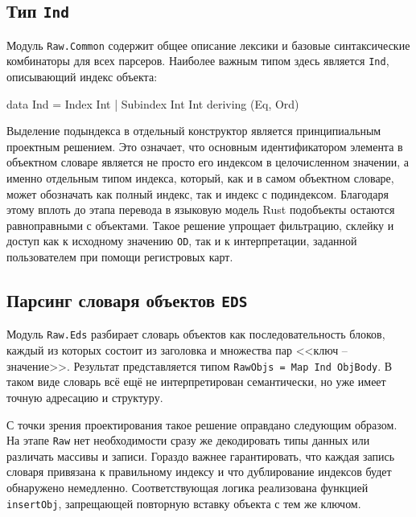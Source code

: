 \documentclass[a4paper,12pt]{article}
\begin{document}
\subsection{Тип \texttt{Ind}}

Модуль \texttt{Raw.Common} содержит общее описание лексики и базовые синтаксические
комбинаторы для всех парсеров. Наиболее важным типом здесь является \texttt{Ind},
описывающий индекс объекта:

\begin{flushleft}
\label{lst:ind}
\begin{MyCodes}
data Ind
  = Index Int
  | Subindex Int Int
  deriving (Eq, Ord)
\end{MyCodes}
\end{flushleft}

Выделение подындекса в отдельный конструктор является принципиальным проектным
решением. Это означает, что основным идентификатором элемента в объектном словаре
является не просто его индексом в целочисленном значении, а именно отдельным типом индекса,
который, как и в самом объектном словаре, может обозначать как полный индекс, так и
индекс с подиндексом. Благодаря этому вплоть до этапа перевода в языковую модель Rust
подобъекты остаются равноправными с объектами. Такое решение упрощает фильтрацию,
склейку и доступ как к исходному значению \texttt{OD}, так и к интерпретации,
заданной пользователем при помощи регистровых карт.

\subsection{Парсинг словаря объектов \texttt{EDS}}

Модуль \texttt{Raw.Eds} разбирает словарь объектов как последовательность блоков, каждый
из которых состоит из заголовка и множества пар <<ключ -- значение>>. Результат
представляется типом \texttt{RawObjs = Map Ind ObjBody}. В таком виде словарь всё ещё
не интерпретирован семантически, но уже имеет точную адресацию и структуру.

С точки зрения проектирования такое решение оправдано следующим образом. На этапе
\texttt{Raw} нет необходимости сразу же декодировать типы данных или различать массивы и
записи. Гораздо важнее гарантировать, что каждая запись словаря привязана к правильному
индексу и что дублирование индексов будет обнаружено немедленно. Соответствующая логика
реализована функцией \texttt{insertObj}, запрещающей повторную вставку объекта с тем же
ключом.
\end{document}
